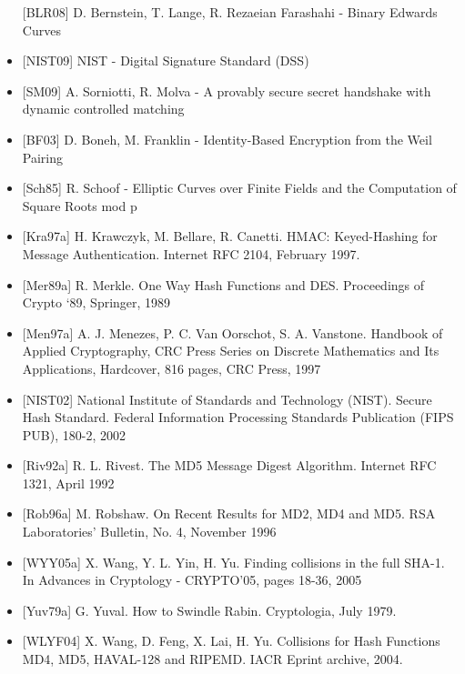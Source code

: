 \documentclass[a4paper]{article}
\begin{document}
\begin{multicols}{3}
\begin{itemize}
              {[}BLR08{]} D. Bernstein, T. Lange, R. Rezaeian Farashahi - Binary
              Edwards Curves
        \item
              {[}NIST09{]} NIST - Digital Signature Standard (DSS)
        \item
              {[}SM09{]} A. Sorniotti, R. Molva - A provably secure secret handshake
              with dynamic controlled matching
        \item
              {[}BF03{]} D. Boneh, M. Franklin - Identity-Based Encryption from the
              Weil Pairing
        \item
              {[}Sch85{]} R. Schoof - Elliptic Curves over Finite Fields and the
              Computation of Square Roots mod p
        \item
              {[}Kra97a{]} H. Krawczyk, M. Bellare, R. Canetti. HMAC: Keyed-Hashing
              for Message Authentication. Internet RFC 2104, February 1997.
        \item
              {[}Mer89a{]} R. Merkle. One Way Hash Functions and DES. Proceedings of
              Crypto `89, Springer, 1989
        \item
              {[}Men97a{]} A. J. Menezes, P. C. Van Oorschot, S. A. Vanstone.
              Handbook of Applied Cryptography, CRC Press Series on Discrete
              Mathematics and Its Applications, Hardcover, 816 pages, CRC Press,
              1997
        \item
              {[}NIST02{]} National Institute of Standards and Technology (NIST).
              Secure Hash Standard. Federal Information Processing Standards
              Publication (FIPS PUB), 180-2, 2002
        \item
              {[}Riv92a{]} R. L. Rivest. The MD5 Message Digest Algorithm. Internet
              RFC 1321, April 1992
        \item
              {[}Rob96a{]} M. Robshaw. On Recent Results for MD2, MD4 and MD5. RSA
              Laboratories' Bulletin, No. 4, November 1996
        \item
              {[}WYY05a{]} X. Wang, Y. L. Yin, H. Yu. Finding collisions in the full
              SHA-1. In Advances in Cryptology - CRYPTO'05, pages 18-36, 2005
        \item
              {[}Yuv79a{]} G. Yuval. How to Swindle Rabin. Cryptologia, July 1979.
        \item
              {[}WLYF04{]} X. Wang, D. Feng, X. Lai, H. Yu. Collisions for Hash
              Functions MD4, MD5, HAVAL-128 and RIPEMD. IACR Eprint archive, 2004.

\end{itemize}
\end{multicols}
\end{document}
